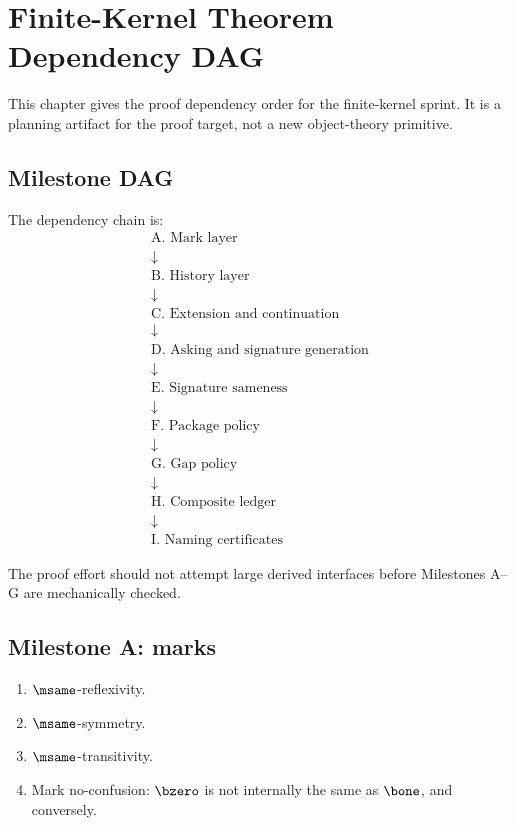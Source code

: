 \chapter{Finite-Kernel Theorem Dependency DAG}
\label{ch:theorem-dependency-dag}

This chapter gives the proof dependency order for the finite-kernel sprint. It is a planning artifact for the proof target, not a new object-theory primitive.

\section{Milestone DAG}

The dependency chain is:
$$
\begin{array}{c}
\text{A. Mark layer}\\[2pt]
\downarrow\\[-2pt]
\text{B. History layer}\\[2pt]
\downarrow\\[-2pt]
\text{C. Extension and continuation}\\[2pt]
\downarrow\\[-2pt]
\text{D. Asking and signature generation}\\[2pt]
\downarrow\\[-2pt]
\text{E. Signature sameness}\\[2pt]
\downarrow\\[-2pt]
\text{F. Package policy}\\[2pt]
\downarrow\\[-2pt]
\text{G. Gap policy}\\[2pt]
\downarrow\\[-2pt]
\text{H. Composite ledger}\\[2pt]
\downarrow\\[-2pt]
\text{I. Naming certificates}
\end{array}
$$

The proof effort should not attempt large derived interfaces before Milestones A--G are mechanically checked.

\section{Milestone A: marks}

\begin{enumerate}
  \item \(\msame\)-reflexivity.
  \item \(\msame\)-symmetry.
  \item \(\msame\)-transitivity.
  \item Mark no-confusion: \(\bzero\) is not internally the same as \(\bone\), and conversely.
\end{enumerate}

